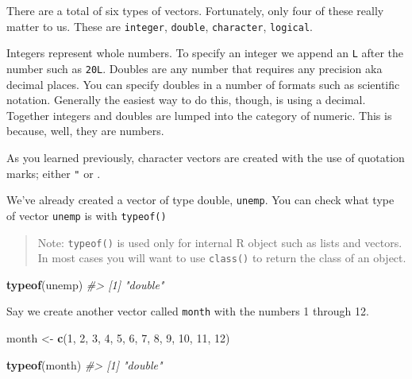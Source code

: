 \documentclass[
]{book}
\newenvironment{Shaded}{\begin{snugshade}}{\end{snugshade}}
\newcommand{\CommentTok}[1]{\textcolor[rgb]{0.56,0.35,0.01}{\textit{#1}}}
\newcommand{\DecValTok}[1]{\textcolor[rgb]{0.00,0.00,0.81}{#1}}
\newcommand{\KeywordTok}[1]{\textcolor[rgb]{0.13,0.29,0.53}{\textbf{#1}}}
\newcommand{\NormalTok}[1]{#1}
\newcommand{\StringTok}[1]{\textcolor[rgb]{0.31,0.60,0.02}{#1}}
\begin{document}
There are a total of six types of vectors. Fortunately, only four of these really matter to us. These are \texttt{integer}, \texttt{double}, \texttt{character}, \texttt{logical}.

Integers represent whole numbers. To specify an integer we append an \texttt{L} after the number such as \texttt{20L}. Doubles are any number that requires any precision aka decimal places. You can specify doubles in a number of formats such as scientific notation. Generally the easiest way to do this, though, is using a decimal. Together integers and doubles are lumped into the category of numeric. This is because, well, they are numbers.

As you learned previously, character vectors are created with the use of quotation marks; either \texttt{"} or \texttt{\textquotesingle{}}.

We've already created a vector of type double, \texttt{unemp}. You can check what type of vector \texttt{unemp} is with \texttt{typeof()}

\begin{quote}
Note: \texttt{typeof()} is used only for internal R object such as lists and vectors. In most cases you will want to use \texttt{class()} to return the class of an object.
\end{quote}

\begin{Shaded}
\begin{Highlighting}[]
\KeywordTok{typeof}\NormalTok{(unemp)}
\CommentTok{\#\textgreater{} [1] "double"}
\end{Highlighting}
\end{Shaded}

Say we create another vector called \texttt{month} with the numbers 1 through 12.

\begin{Shaded}
\begin{Highlighting}[]
\NormalTok{month \textless{}{-}}\StringTok{ }\KeywordTok{c}\NormalTok{(}\DecValTok{1}\NormalTok{, }\DecValTok{2}\NormalTok{, }\DecValTok{3}\NormalTok{, }\DecValTok{4}\NormalTok{, }\DecValTok{5}\NormalTok{, }\DecValTok{6}\NormalTok{, }\DecValTok{7}\NormalTok{, }\DecValTok{8}\NormalTok{, }\DecValTok{9}\NormalTok{, }\DecValTok{10}\NormalTok{, }\DecValTok{11}\NormalTok{, }\DecValTok{12}\NormalTok{)}

\KeywordTok{typeof}\NormalTok{(month)}
\CommentTok{\#\textgreater{} [1] "double"}
\end{Highlighting}
\end{Shaded}
\end{document}
